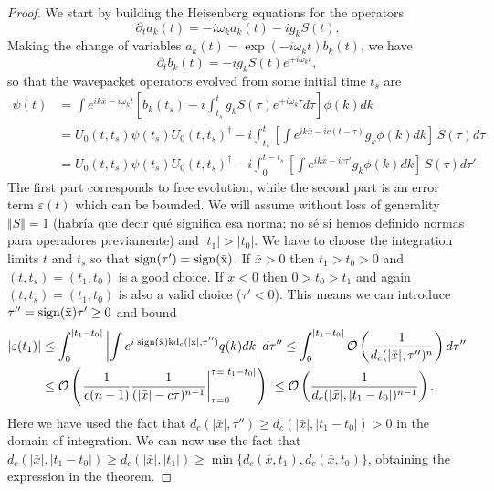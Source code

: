 \documentclass[notitlepage, prx, preprint, amsmath,superscriptaddress,amssymb]{revtex4-1}
\begin{document}
\begin{proof}
We start by building the Heisenberg equations for the operators
\begin{equation}
\partial_t a_k(t) = -i\omega_k a_k(t) - i g_k S(t).
\end{equation}
Making the change of variables $a_k(t) = \exp(-i\omega_k t)b_k(t)$, we have
\begin{equation}
\partial_t b_k(t) = -ig_k S(t) e^{+i\omega_k t},
\end{equation}
so that the wavepacket operators evolved from some initial time $t_{s}$ are
\begin{align}
\psi(t) &= \int e^{ik \bar x - i \omega_k t} \left[b_k(t_s)
-i\int_{t_{s}}^t g_k S(\tau)e^{+i\omega_k \tau}d\tau\right]\phi(k)dk\\
&=U_0(t,t_s)\psi(t_s)U_0(t,t_s)^\dagger - 
i\int_{t_{s}}^t \left[\int e^{ik\bar x-ic(t-\tau)}g_k\phi(k)dk
\right]\,S(\tau)d\tau\\
&=U_0(t,t_s)\psi(t_s)U_0(t,t_s)^\dagger- 
i\int_{0}^{t-t_s} \left[\int e^{ik\bar x-ic\tau'}g_k\phi(k)dk
\right]\,S(\tau)d\tau'.
\end{align}
The first part corresponds to free evolution, while the second part is an error term $\varepsilon(t)$ which can be bounded. We will assume without loss of generality $\Vert{S}\Vert=1$ {\color{red}(habría que decir qué significa esa norma; no sé si hemos definido normas para operadores previamente)} and $|t_1|>|t_0|$. We have to choose the integration limits $t$ and $t_s$ so that $\rm{sign}(\tau')=\rm{sign}(\bar x)$. If $\bar x>0$ then $t_1>t_0>0$ and $(t,t_s)=(t_1,t_0)$ is a good choice. If $x<0$ then $0>t_0>t_1$ and again $(t,t_s)=(t_1,t_0)$ is also a valid choice ($\tau'<0$). This means we can introduce $\tau''=\rm{sign}(\bar x)\tau'\geq 0$ and bound
\begin{align}
|\varepsilon(t_1)|
&\leq \int_{0}^{|t_1-t_0|} \left|\int e^{i\;\rm{sign}(\bar x)kd_c(|x|,\tau'')}q(k)dk\right|d\tau''
\leq \int_{0}^{|t_1-t_0|} \mathcal{O}\left(\frac{1}{d_c(|\bar x|,\tau'')^{n}}\right)d\tau''\\
&\leq \mathcal{O}\left(
\left. \frac{1}{c(n-1)} \frac{1}{(|\bar x|-c\tau)^{n-1}}\right|_{\tau=0}^{\tau=|t_1-t_0|}\right)\
\leq \mathcal{O}\left(\frac{1}{d_c(|\bar x|,|t_1-t_0|)^{n-1}}\right).
\end{align}
Here we have used the fact that $d_c(|\bar x|,\tau'')\geq d_c(|\bar x|,|t_1-t_0|)> 0$ in the domain of integration. We can now use the fact that $d_c(|\bar x|,|t_1-t_0|)\geq d_c(|\bar x|,|t_1|)\geq \min\{d_c(\bar x,t_1),d_c(\bar x,t_0)\}$, obtaining the expression in the theorem.
\end{proof}
\end{document}
